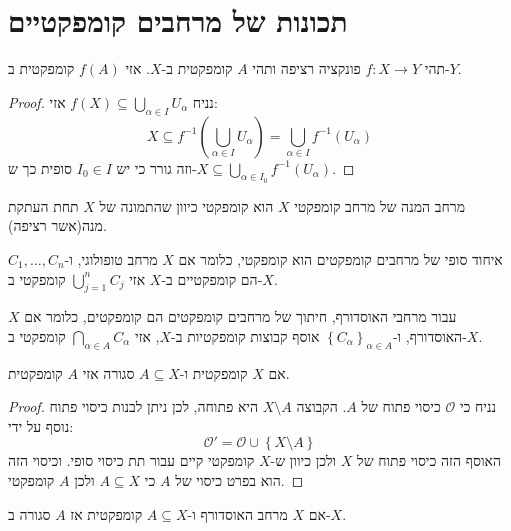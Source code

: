 \documentclass{tstextbook}
\begin{document}
\section{תכונות של מרחבים קומפקטיים}

\begin{proposition}
תהי \(f:X\to Y\) פונקציה רציפה ותהי \(A\) קומפקטית ב-\(X\). אזי \(f(A)\) קומפקטית ב-\(Y\).

\end{proposition}
\begin{proof}
נניח \(f(X)\subseteq \bigcup_{\alpha \in I}U_{\alpha}\) אזי:
$$X\subseteq f^{-1} \left( \bigcup_{\alpha \in I}U_{\alpha} \right)=\bigcup_{\alpha \in I}f^{-1} (U_{\alpha})$$
וזה גורר כי יש \(I_{0} \in I\) סופית כך ש-\(X\subseteq \bigcup_{{\alpha \in I_{0}}}f^{-1}(U_{\alpha})\).

\end{proof}
\begin{corollary}
מרחב המנה של מרחב קומפקטי \(X\) הוא קומפקטי כיוון שהתמונה של \(X\) תחת העתקת מנה(אשר רציפה).

\end{corollary}
\begin{proposition}
איחוד סופי של מרחבים קומפקטים הוא קומפקטי, כלומר אם \(X\) מרחב טופולוגי, ו-\(C_{1},\dots,C_{n}\) הם קומפקטיים ב-\(X\) אזי \(\bigcup_{j=1}^{n}C_{j}\) קומפקטי ב-\(X\). 

\end{proposition}
\begin{proposition}
עבור מרחבי האוסדורף, חיתוך של מרחבים קומפקטים הם קומפקטים, כלומר אם \(X\) האוסדורף, ו-\(\left\{  C_{\alpha}  \right\}_{\alpha \in A}\) אוסף קבוצות קומפקטיות ב-\(X\), אזי \(\bigcap_{\alpha \in A}C_{\alpha}\) קומפקטי ב-\(X\).

\end{proposition}
\begin{proposition}
אם \(X\) קומפקטית ו-\(A\subseteq X\) סגורה אזי \(A\) קומפקטית.

\end{proposition}
\begin{proof}
נניח כי \(\mathcal{O}\) כיסוי פתוח של \(A\). הקבוצה \(X\setminus A\) היא פתוחה, לכן ניתן לבנות כיסוי פתוח נוסף על ידי:
$$\mathcal{O} '=\mathcal{O}\cup \left\{  X\setminus A  \right\} $$
האוסף הזה כיסוי פתוח של \(X\) ולכן כיוון ש-\(X\) קומפקטי קיים עבור תת כיסוי סופי. וכיסוי הזה הוא בפרט כיסוי של \(A\) כי \(A\subseteq X\) ולכן \(A\) קומפקטי.

\end{proof}
\begin{proposition}
אם \(X\) מרחב האוסדורף ו-\(A\subseteq X\) קומפקטית אז \(A\) סגורה ב-\(X\).

\end{proposition}
\end{document}
